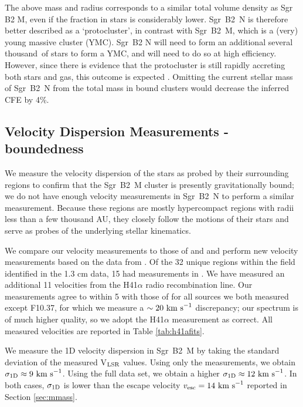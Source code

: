\documentclass[twocolumn]{aastex62}
\begin{document}
The above mass and radius corresponds to a similar total volume density as Sgr
B2 M, even if the fraction in stars is considerably lower. Sgr~B2~N is
therefore better described as a `protocluster', in contrast with
Sgr~B2~M, which is a (very) young massive cluster (YMC).  Sgr~B2 N will need to
form an additional several thousand~\msun of stars to form a YMC, and will need
to do so at high efficiency.  However, since there is evidence that the
protocluster is still rapidly accreting both stars and gas, this outcome
is expected \citep[cf.][]{Ginsburg2016b}. Omitting the current stellar mass of
Sgr~B2~N from the total mass in bound clusters would decrease the inferred CFE
by 4\%.


\subsection{Velocity Dispersion Measurements - boundedness}
\label{sec:vdisp}
We measure the velocity dispersion of the stars as probed by their surrounding
\hii regions to confirm that the Sgr~B2~M cluster is presently gravitationally
bound; we do not have enough velocity measurements in Sgr~B2~N to perform a
similar measurement.
Because these regions are mostly hypercompact \hii regions with radii less than a few
thousand AU, they closely follow the motions of their stars and serve as 
probes of the underlying stellar kinematics.

We compare our velocity measurements to those of \citet{De-Pree2011a} and
\citet{De-Pree1996a} and perform  new velocity measurements based on the
data from \citet{Ginsburg2018a}.  Of the 32 unique \hii regions within the field
identified in the \citet{Gaume1995a} 1.3 cm data, 
15 had measurements in \citet{De-Pree2011a}.  We have measured an additional 11
velocities from the H41$\alpha$ radio recombination line.  Our measurements
agree to within 5 \kms with those of \citet{De-Pree2011a} for all sources we
both measured except F10.37, for which we measure a $\sim20~\textrm{km~s}^{-1}$ discrepancy;
our spectrum is of much higher quality, so we adopt the H41$\alpha$ measurement
as correct.  All measured velocities are reported in Table \ref{tab:h41afits}.

We measure the 1D velocity dispersion in Sgr~B2~M by taking the standard
deviation of the measured V$_{\rm LSR}$ values.  Using only the
\citet{De-Pree2011a} measurements, we obtain $\sigma_{\rm 1D}\approx9~\textrm{km~s}^{-1}$.  Using
the full data set, we obtain a higher $\sigma_{\rm 1D}\approx12~\textrm{km~s}^{-1}$.  In both
cases, $\sigma_{\rm 1D}$ is  lower than the escape velocity
$v_{\rm esc}=14~\textrm{km~s}^{-1}$ reported in Section \ref{sec:mmass}.
\end{document}
